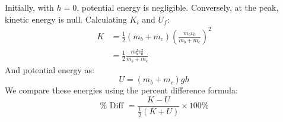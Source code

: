 \documentclass{report}
\begin{document}
    \bigbreak \noindent
    Initially, with $h=0$, potential energy is negligible. Conversely, at the peak, kinetic energy is null. Calculating $K_i$ and $U_f$:
    \begin{equation}
        \begin{split}
            K & =\frac{1}{2}\left(m_b+m_c\right)\left(\frac{m_b v_0}{m_b+m_c}\right)^2 \\
              & =\frac{1}{2} \frac{m_b^2 v_0^2}{m_b+m_c}
        \end{split}
    \end{equation}
    \bigbreak \noindent
    And potential energy as:
    \begin{equation}
        U=\left(m_b+m_c\right) g h
    \end{equation}
    \bigbreak \noindent
    We compare these energies using the percent difference formula:
    \begin{equation}
        \% \text { Diff }=\frac{K-U}{\frac{1}{2}(K+U)} \times 100 \%
    \end{equation}


    \bigbreak \noindent
\end{document}
